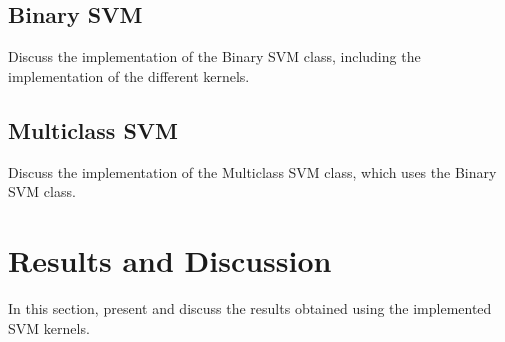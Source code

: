 \documentclass[12pt]{article}
\begin{document}
\subsection{Binary SVM}
Discuss the implementation of the Binary SVM class, including the implementation of the different kernels.

\subsection{Multiclass SVM}
Discuss the implementation of the Multiclass SVM class, which uses the Binary SVM class.

\section{Results and Discussion}
In this section, present and discuss the results obtained using the implemented SVM kernels.
\end{document}
